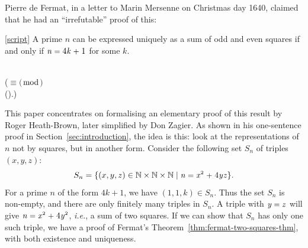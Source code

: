 \documentclass[sigplan,screen]{acmart}
\newcommand\urlpre{https://bitbucket.org/jhlchan/project/src/aed43871448e/fermat/twosq/}
\newcommand{\script}[3][script]{\href{\urlpre#2Script.sml\#lines-#3}{[#1]}} %
\newcommand{\script}[3][script]{\textit{[script]}} %
\newcommand{\m}[1]{\todo[fancyline,color=blue!40,size=\scriptsize]{\textsf{JC: #1}}} %
\newcommand{\ie}{\textit{i.e.}}
\renewcommand{\HOLinline}[1]{\ensuremath{#1}} %
\renewcommand{\HOLConst}[1]{{\fontsize{9pt}{1em}\selectfont\textsf{\upshape #1}}}
\renewcommand{\HOLNumLit}[1]{{\selectfont\textrm{\upshape #1}}} %
\renewcommand{\HOLSymConst}[1]{{\fontsize{9pt}{1em}\selectfont\textsf{\upshape #1}}}
\begin{document}
\noindent
Pierre de Fermat, in a letter to Marin Mersenne on Christmas day 1640,
claimed that he had an ``irrefutable'' proof of this:
\begin{theorem}
\label{thm:fermat-two-squares-thm}
\script{twoSquares}{619}
A prime $n$ can be expressed uniquely as a sum of odd and even squares
if and only if \HOLinline{\HOLFreeVar{n}\;\HOLSymConst{=}\;\HOLNumLit{4}\HOLSymConst{\ensuremath{}}\HOLFreeVar{k}\;\HOLSymConst{\ensuremath{+}}\;\HOLNumLit{1}} for some $k$.
\begin{HOLmath}
\HOLTokenTurnstile{}\HOLConst{prime}\;\;\HOLSymConst{\HOLTokenImp{}}\\
\;\;\;\;\;\;\;(\;\ensuremath{\equiv}\;\HOLNumLit{1}\;\ensuremath{(}\ensuremath{\bmod}\;\HOLNumLit{4}\ensuremath{)}\;\HOLSymConst{\HOLTokenEquiv{}}\\
\;\;\;\;\;\;\;\;\;\;\HOLSymConst{\HOLTokenUnique{}}(\HOLBoundVar{u}\HOLSymConst{,}).\;\HOLConst{\HOLConst{odd}}\;\;\HOLSymConst{\HOLTokenConj{}}\;\HOLConst{\HOLConst{even}}\;\;\HOLSymConst{\HOLTokenConj{}}\;\;\HOLSymConst{=}\;\HOLBoundVar{u}\HOLSymConst{\ensuremath{\sp{2}}}\;\HOLSymConst{\ensuremath{+}}\;\HOLBoundVar{v}\HOLSymConst{\ensuremath{\sp{2}}})
\end{HOLmath}
\end{theorem}

\noindent
This paper concentrates on formalising an elementary proof of this result by Roger Heath-Brown, later simplified by Don Zagier.
As shown in his one-sentence proof in Section~\ref{sec:introduction},
the idea is this: look at the representations of $n$ not by squares, but in another form.
Consider the following set $S_{n}$ of triples $(x,y,z)$:
\begin{equation}
\label{eqn:mills-set}
S_{n} = \{(x,y,z) \in \mathbb{N}\times{\mathbb{N}}\times{\mathbb{N}}
\mid \HOLinline{\HOLFreeVar{n}\;\HOLSymConst{=}\;\HOLFreeVar{x}\HOLSymConst{\ensuremath{\sp{2}}}\;\HOLSymConst{\ensuremath{+}}\;\HOLNumLit{4}\HOLSymConst{\ensuremath{}}\HOLFreeVar{y}\HOLSymConst{\ensuremath{}}\HOLFreeVar{z}} \}.
\end{equation}
For a prime $n$ of the form $4k + 1$, we have $(1,1,k) \in S_{n}$.
Thus the set $S_{n}$ is non-empty, and there are only finitely many triples in $S_{n}$.
A triple with \HOLinline{\HOLFreeVar{y}\;\HOLSymConst{=}\;\HOLFreeVar{z}} will give \HOLinline{\HOLFreeVar{n}\;\HOLSymConst{=}\;\HOLFreeVar{x}\HOLSymConst{\ensuremath{\sp{2}}}\;\HOLSymConst{\ensuremath{+}}\;\HOLNumLit{4}\HOLSymConst{\ensuremath{}}\HOLFreeVar{y}\HOLSymConst{\ensuremath{\sp{2}}}}, \ie, a sum of two squares.
If we can show that $S_{n}$ has only one such triple,
we have a proof of Fermat's Theorem~\ref{thm:fermat-two-squares-thm}, with both existence and uniqueness.
\end{document}
